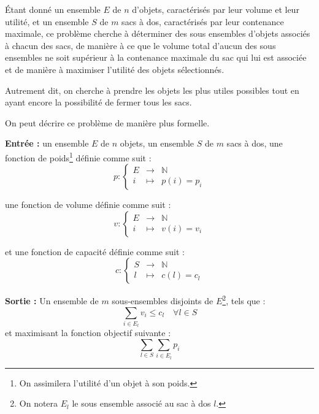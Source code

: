 \documentclass[a4paper,12pt]{thesis}
\begin{document}
Étant donné un ensemble $E$ de $n$ d'objets, caractérisés par leur volume et leur utilité, et un
ensemble $S$ de $m$ sacs à dos, caractérisés par leur contenance maximale, ce problème cherche à
déterminer des sous ensembles d'objets associés à chacun des sacs, de manière à ce que le volume
total d'aucun des sous ensembles ne soit supérieur à la contenance maximale du sac qui lui est
associée et de manière à maximiser l'utilité des objets sélectionnés.

Autrement dit, on cherche à prendre les objets les plus utiles possibles tout en ayant encore la
possibilité de fermer tous les sacs.

On peut décrire ce problème de manière plus formelle.

\textbf{Entrée :} un ensemble $E$ de $n$ objets, un ensemble $S$ de $m$ sacs à dos, une fonction de
poids\footnote{On assimilera l'utilité d'un objet à son poids.} définie comme suit : 
\begin{displaymath}
    p : \left \{ \begin{array}{rcl}
        E & \rightarrow & \mathbb{N} \\
        i & \mapsto & p(i) = p_i
    \end{array} \right .
\end{displaymath}

une fonction de volume définie comme suit :
\begin{displaymath}
    v : \left \{ \begin{array}{rcl}
        E & \rightarrow & \mathbb{N} \\
        i & \mapsto & v(i) = v_i
    \end{array} \right .
\end{displaymath}

et une fonction de capacité définie comme suit :
\begin{displaymath}
    c : \left \{ \begin{array}{rcl}
        S & \rightarrow & \mathbb{N} \\
        l & \mapsto & c(l) = c_l
    \end{array} \right .
\end{displaymath}

\textbf{Sortie :} Un ensemble de $m$ sous-ensembles disjoints de $E$\footnote{On notera $E_l$ le
sous ensemble associé au sac à dos $l$.}, tels que : \begin{displaymath}
    \sum_{i \in E_l} v_i \leq c_l \quad \forall l \in S
\end{displaymath}
et maximisant la fonction objectif suivante : \begin{displaymath}
    \sum_{l \in S} \sum_{i \in E_l} p_i
\end{displaymath}
\end{document}
